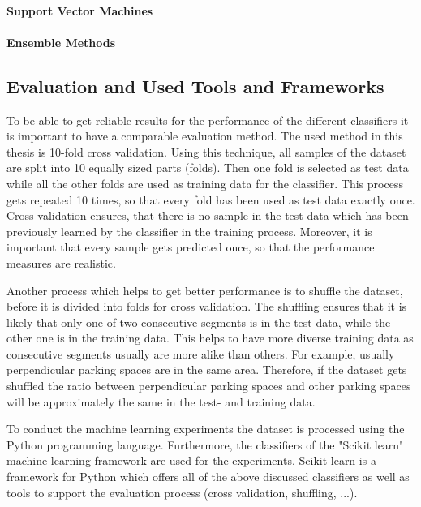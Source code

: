 \paragraph{Support Vector Machines}
\paragraph{Ensemble Methods}


\subsection{Evaluation and Used Tools and Frameworks}

To be able to get reliable results for the performance of the different classifiers it is important to have a comparable evaluation method. The used method in this thesis is 10-fold cross validation. Using this technique, all samples of the dataset are split into 10 equally sized parts (folds). Then one fold is selected as test data while all the other folds are used as training data for the classifier. This process gets repeated 10 times, so that every fold has been used as test data exactly once. Cross validation ensures, that there is no sample in the test data which has been previously learned by the classifier in the training process. Moreover, it is important that every sample gets predicted once, so that the performance measures are realistic.

Another process which helps to get better performance is to shuffle the dataset, before it is divided into folds for cross validation. The shuffling ensures that it is likely that only one of two consecutive segments is in the test data, while the other one is in the training data. This helps to have more diverse training data as consecutive segments usually are more alike than others. For example, usually perpendicular parking spaces are in the same area. Therefore, if the dataset gets shuffled the ratio between perpendicular parking spaces and other parking spaces will be approximately the same in the test- and training data.



To conduct the machine learning experiments the dataset is processed using the Python programming language. Furthermore, the classifiers of the "Scikit learn" machine learning framework are used for the experiments. Scikit learn is a framework for Python which offers all of the above discussed classifiers as well as tools to support the evaluation process (cross validation, shuffling, ...).






